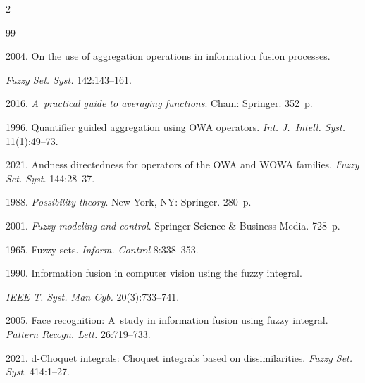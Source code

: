 \begin{multicols}{2}
{{\begin{thebibliography}{99}


 2004. On the use of aggregation operations in information fusion processes. 


\textit{Fuzzy Set. Syst.} 142:143--161.




 2016. \textit{A~practical guide to averaging functions}. Cham: Springer. 352~p. 




 1996. Quantifier guided aggregation using OWA operators. \textit{Int. J.~Intell. Syst.} 11(1):49--73.




 2021. Andness directedness for operators of the OWA and WOWA families. \textit{Fuzzy Set. Syst.} 144:28--37.







 1988. \textit{Possibility theory}. New York, NY: Springer. 280~p.




 2001. \textit{Fuzzy modeling and control}. Springer Science \& Business Media. 728~p.







 1965. Fuzzy sets. \textit{Inform. Control} 8:338--353.




 1990. Information fusion in computer vision using the fuzzy integral.


\textit{IEEE T. Syst. Man Cyb.} 20(3):733--741.




 2005. Face recognition: A~study in information fusion using fuzzy integral. \textit{Pattern Recogn. Lett.} 26:719--733.






 2021. d-Choquet integrals: Choquet integrals based on dissimilarities. \textit{Fuzzy Set. Syst.} 414:1--27.



\end{thebibliography}}}
\end{multicols}
